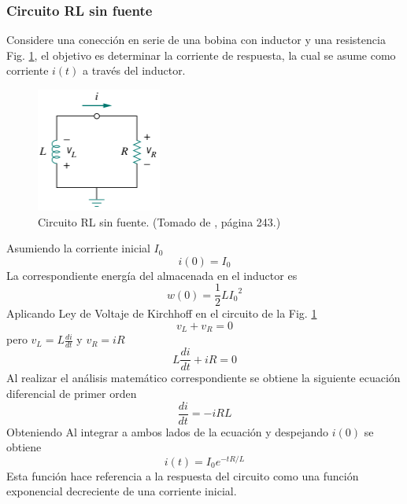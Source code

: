 \documentclass[twocolumn]{IEEEtran}
\begin{document}
\subsubsection{Circuito RL sin fuente}
\noindent
Considere una conección en serie de una bobina con inductor y una resistencia Fig. \ref{rlsin}, el objetivo es determinar la corriente de respuesta, la cual se asume como corriente $i(t)$ a través del inductor.
\begin{figure}[H]
	\centering
		\includegraphics[scale=0.8]{rlsinsource.png}
	\caption{Circuito RL sin fuente. (Tomado de \cite{sadiku}, página 243.)}
	\label{rlsin}
\end{figure}
\noindent
Asumiendo la corriente inicial $I_0$
\begin{equation}
 i(0) = I_0
\end{equation}
\noindent
La correspondiente energía del almacenada en el inductor es
\begin{equation}
 w(0) = \frac{1}{2} L{I_0}^{2}
\end{equation}
\noindent
Aplicando Ley de Voltaje de Kirchhoff en el circuito de la Fig. \ref{rlsin}
\begin{equation}
v_L + v_R = 0 
\end{equation}
\noindent
pero $v_L = L \frac{di}{dt}$ y $v_R = iR$
\begin{equation}
 L \frac{di}{dt} + iR = 0
\end{equation}
\noindent
Al realizar el análisis matemático correspondiente se obtiene la siguiente ecuación diferencial de primer orden
\begin{equation}
 \frac{di}{dt}= - iRL
\end{equation}
\noindent
Obteniendo Al integrar a ambos lados de la ecuación y despejando $i(0)$ se obtiene
\begin{equation}
 i(t) = I_{0}{e^{ - tR/L}}
\label{eqnatrl}
\end{equation}
\noindent
Esta función hace referencia a la respuesta del circuito como una función exponencial decreciente de una corriente inicial.
\end{document}
